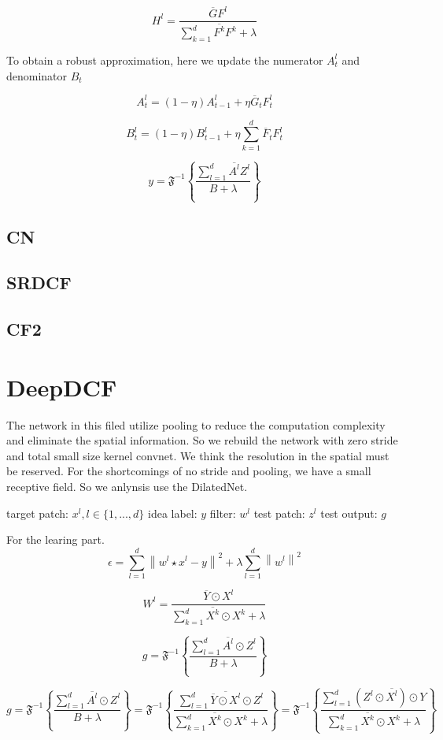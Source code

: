 \documentclass[11pt]{article}
\begin{document}
$$
H^{l}=\frac{\overline{G}F^{l}}{\sum_{k=1}^{d}\overline{F^{k}}F^{k}+\lambda}
$$


To obtain a robust approximation, here we update the numerator $A_ {t}^{l} $ and denominator $ B_{t} $

$$
A_{t}^{l} = (1-\eta )A_{t-1}^{l}+\eta \overline{G}_{t}F_{t}^{l}
$$

$$
B_{t}^{l} = (1-\eta )B_{t-1}^{l}+\eta \sum_{k=1}^{d}\overline{F}_{t}F_{t}^{l}
$$

$$
y=\mathfrak{F}^{-1}\left\{ \frac{\sum_{l=1}^{d}\overline{A^{l}}Z^{l}}{B+\lambda}\right\}
$$


	\subsection{CN}


	\subsection{SRDCF}
	\subsection{CF2}

	
	\section{DeepDCF}
	
 The network in this filed utilize pooling to reduce the computation complexity and eliminate the spatial information.
 So we rebuild the network with zero stride and total small size kernel convnet. We think the resolution in the spatial must be reserved. For the shortcomings of no stride and pooling, we have a small receptive field. So we anlynsis use the DilatedNet.
	
	
target patch: $ x^{l} ,l\in \{ 1,...,d \} $
idea label: $ y $
filter: $ w^{l} $
test patch: $ z^{l} $
test output: $ g $

For the learing part.
$$
\epsilon =  \sum_{l=1}^{d}\left \| w^{l}\star x^{l}-y \right \|^{2} +\lambda \sum_{l=1}^{d}\left\|w^{l} \right\|^{2}
$$

$$
W^{l}=\frac{\overline{Y} \odot X^{l}}{\sum_{k=1}^{d}\overline{X^{k}} \odot X^{k}+\lambda}
$$


$$
g=\mathfrak{F}^{-1}\left\{ \frac{\sum_{l=1}^{d}\overline{A^{l}} \odot Z^{l}}{B+\lambda}\right\}
$$

$$
g=\mathfrak{F}^{-1}\left\{ \frac{\sum_{l=1}^{d}\overline{A^{l}} \odot Z^{l}}{B+\lambda}\right\} 
=\mathfrak{F}^{-1}\left\{\frac{ \sum_{l=1}^{d}\overline{\overline{Y} \odot X^{l}} \odot Z^{l}}{\sum_{k=1}^{d}\overline{X^{k}} \odot X^{k}+\lambda}\right\} 
=\mathfrak{F}^{-1}\left\{\frac{ \sum_{l=1}^{d}(Z^{l} \odot \overline{X^{l}}) \odot Y}{\sum_{k=1}^{d}\overline{X^{k}} \odot X^{k}+\lambda}\right\}
$$
\end{document}
